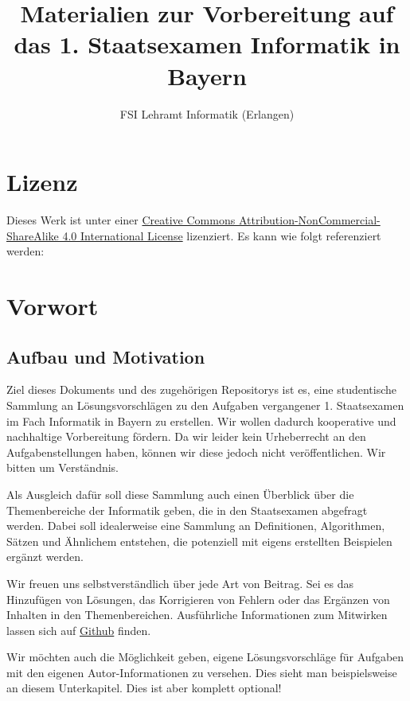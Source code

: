 \documentclass{book}
\title{Materialien zur Vorbereitung auf das 1. Staatsexamen Informatik in Bayern}
\author{FSI Lehramt Informatik (Erlangen)}
\begin{document}
\maketitle
\chapter*{Lizenz}
Dieses Werk ist unter einer
\href{https://creativecommons.org/licenses/by-nc-sa/4.0/}{Creative Commons
Attribution-NonCommercial-ShareAlike 4.0 International License} lizenziert. Es
kann wie folgt referenziert werden:


\tableofcontents
\chapter{Vorwort}
\section{Aufbau und Motivation}
Ziel dieses Dokuments und des zugehörigen Repositorys ist es, eine studentische
Sammlung an Lösungsvorschlägen zu den Aufgaben vergangener 1. Staatsexamen im
Fach Informatik in Bayern zu erstellen. Wir wollen dadurch kooperative und
nachhaltige Vorbereitung fördern. Da wir leider kein Urheberrecht an den
Aufgabenstellungen haben, können wir diese jedoch nicht veröffentlichen. Wir
bitten um Verständnis.

Als Ausgleich dafür soll diese Sammlung auch einen Überblick über die
Themenbereiche der Informatik geben, die in den Staatsexamen abgefragt werden.
Dabei soll idealerweise eine Sammlung an Definitionen, Algorithmen, Sätzen und
Ähnlichem entstehen, die potenziell mit eigens erstellten Beispielen ergänzt
werden.

Wir freuen uns selbstverständlich über jede Art von Beitrag. Sei es das Hinzufügen von Lösungen,
das Korrigieren von Fehlern oder das Ergänzen von Inhalten in den
Themenbereichen. Ausführliche Informationen zum Mitwirken lassen sich auf
\href{https://github.com/fsi-la-inf/stex-stuff/.github/CONTRIBUTING.md}{Github} finden.

Wir möchten auch die Möglichkeit geben, eigene Lösungsvorschläge für
Aufgaben mit den eigenen Autor-Informationen zu versehen. Dies sieht man
beispielsweise an diesem Unterkapitel. Dies ist aber komplett optional!




\printindex{}
\end{document}
